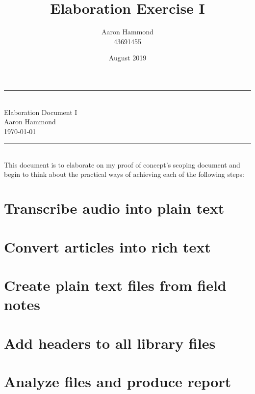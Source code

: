 \documentclass{article}
\title{Elaboration Exercise I}
\author{Aaron Hammond\\43691455}
\date{August 2019}
\newcommand\HRule{\rule{\textwidth}{1pt}} %
\begin{document}

\begin{titlepage}


\begin{center}
\HRule\\[0.4cm]
\huge{Elaboration Document I}\\[0.5cm]
\huge{Aaron Hammond}\\
\large{\today}\\[0.4cm]

\HRule \\[1cm]


\noindent This document is to elaborate on my proof of concept's scoping document and begin to think about the practical ways of achieving each  of the following steps:
\end{center}

\def\contentsname{\empty} %
\tableofcontents

\end{titlepage}


\section{Transcribe audio into plain text}
\section{Convert articles into rich text}
\section{Create plain text files from field notes}
\section{Add headers to all library files}
\section{Analyze files and produce report}
\
\end{document}
